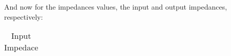 And now for the impedances values, the input and output impedances, respectively:

\FloatBarrier
\begin{table}[h]
  \centering
  \begin{tabular}{|c|}
    \hline    
    
    \hline
  \end{tabular}
  \caption{Input Impedace}
  \label{tab:Spice1}
\end{table}
\FloatBarrier   

%    




